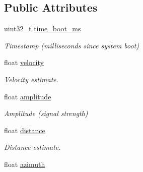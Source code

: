 \subsection*{Public Attributes}
\begin{DoxyCompactItemize}
\item 
\hypertarget{struct____mavlink__radar__tracked__target__t_a4fbde1e8d43302af33eed4f4d3e5b8cc}{uint32\+\_\+t \hyperlink{struct____mavlink__radar__tracked__target__t_a4fbde1e8d43302af33eed4f4d3e5b8cc}{time\+\_\+boot\+\_\+ms}}\label{struct____mavlink__radar__tracked__target__t_a4fbde1e8d43302af33eed4f4d3e5b8cc}

\begin{DoxyCompactList}\small\item\em Timestamp (milliseconds since system boot) \end{DoxyCompactList}\item 
\hypertarget{struct____mavlink__radar__tracked__target__t_ac2b261f4add35857d88410dd77189327}{float \hyperlink{struct____mavlink__radar__tracked__target__t_ac2b261f4add35857d88410dd77189327}{velocity}}\label{struct____mavlink__radar__tracked__target__t_ac2b261f4add35857d88410dd77189327}

\begin{DoxyCompactList}\small\item\em Velocity estimate. \end{DoxyCompactList}\item 
\hypertarget{struct____mavlink__radar__tracked__target__t_a070dd549bec561a35d6b125d7d775a9b}{float \hyperlink{struct____mavlink__radar__tracked__target__t_a070dd549bec561a35d6b125d7d775a9b}{amplitude}}\label{struct____mavlink__radar__tracked__target__t_a070dd549bec561a35d6b125d7d775a9b}

\begin{DoxyCompactList}\small\item\em Amplitude (signal strength) \end{DoxyCompactList}\item 
\hypertarget{struct____mavlink__radar__tracked__target__t_a25e85cda1fbd9c07f57a40c0a7d2a127}{float \hyperlink{struct____mavlink__radar__tracked__target__t_a25e85cda1fbd9c07f57a40c0a7d2a127}{distance}}\label{struct____mavlink__radar__tracked__target__t_a25e85cda1fbd9c07f57a40c0a7d2a127}

\begin{DoxyCompactList}\small\item\em Distance estimate. \end{DoxyCompactList}\item 
\hypertarget{struct____mavlink__radar__tracked__target__t_a0194c590ef31f1fd6682df4e8d1c3b20}{float \hyperlink{struct____mavlink__radar__tracked__target__t_a0194c590ef31f1fd6682df4e8d1c3b20}{azimuth}}\label{struct____mavlink__radar__tracked__target__t_a0194c590ef31f1fd6682df4e8d1c3b20}


\end{DoxyCompactItemize}
